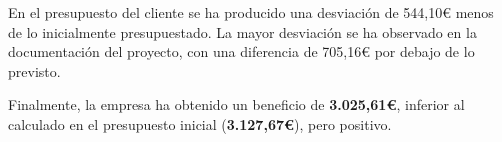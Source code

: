 En el presupuesto del cliente se ha producido una desviación de 544,10€ menos de lo inicialmente presupuestado. 
La mayor desviación se ha observado en la documentación del proyecto, con una diferencia de 705,16€ por debajo de lo previsto.

Finalmente, la empresa ha obtenido un beneficio de \textbf{3.025,61€}, inferior al calculado en el presupuesto inicial (\textbf{3.127,67€}), pero positivo.